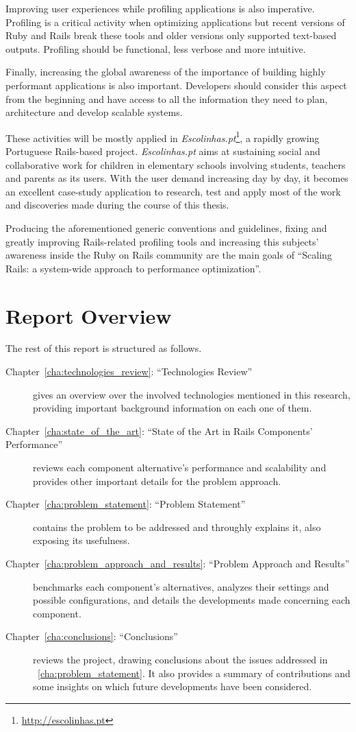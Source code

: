 Improving user experiences while profiling applications is also imperative. Profiling is a critical activity when optimizing applications but recent versions of Ruby and Rails break these tools and older versions only supported text-based outputs. Profiling should be functional, less verbose and more intuitive.

Finally, increasing the global awareness of the importance of building highly performant applications is also important. Developers should consider this aspect from the beginning and have access to all the information they need to plan, architecture and develop scalable systems.

These activities will be mostly applied in \textit{Escolinhas.pt}\footnote{\url{http://escolinhas.pt}}, a rapidly growing Portuguese Rails-based project. \textit{Escolinhas.pt} aims at sustaining social and collaborative work for children in elementary schools involving students, teachers and parents as its users. With the user demand increasing day by day, it becomes an excellent case-study application to research, test and apply most of the work and discoveries made during the course of this thesis.

Producing the aforementioned generic conventions and guidelines, fixing and greatly improving Rails-related profiling tools and increasing this subjects' awareness inside the Ruby on Rails community are the main goals of ``Scaling Rails: a system-wide approach to performance optimization''.


\section{Report Overview} %
\label{sec:report_overview}
The rest of this report is structured as follows.
\begin{description}
  \item[Chapter~\ref{cha:technologies_review}: ``Technologies Review''] gives an overview over the involved technologies mentioned in this research, providing important background information on each one of them.
  \item[Chapter~\ref{cha:state_of_the_art}: ``State of the Art in Rails Components' Performance''] reviews each component alternative's performance and scalability and provides other important details for the problem approach.
  \item[Chapter~\ref{cha:problem_statement}: ``Problem Statement''] contains the problem to be addressed and throughly explains it, also exposing its usefulness.
  \item[Chapter~\ref{cha:problem_approach_and_results}: ``Problem Approach and Results''] benchmarks each component's alternatives, analyzes their settings and possible configurations, and details the developments made concerning each component.
  \item[Chapter~\ref{cha:conclusions}: ``Conclusions''] reviews the project, drawing conclusions about the issues addressed in ~\ref{cha:problem_statement}. It also provides a summary of contributions and some insights on which future developments have been considered.
\end{description}

